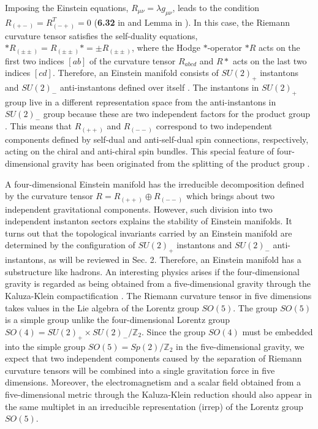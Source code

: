 \documentclass[12pt,epsf]{article}
\begin{document}
Imposing the Einstein equations, $R_{\mu\nu} = \lambda g_{\mu\nu}$, leads to the condition
$R_{(+-)} = R_{(-+)}^T = 0$ (\textbf{6.32} in \cite{book-besse} and Lemma in \cite{oh-yang}).
In this case, the Riemann curvature tensor satisfies the self-duality equations,
$* R_{(\pm \pm)} =  R_{(\pm \pm)} * = \pm  R_{(\pm \pm)}$, where
the Hodge $*$-operator $* R$ acts on the first two indices $[ab]$ of the curvature tensor $R_{abcd}$ and
$R*$ acts on the last two indices $[cd]$.
Therefore, an Einstein manifold consists of $SU(2)_+$ instantons and $SU(2)_-$ anti-instantons
defined over itself \cite{oh-yang,joy-jhep}.
The instantons in $SU(2)_+$ group live in a different representation space from the anti-instantons in $SU(2)_-$ group
because these are two independent factors for the product group .
This means that $R_{(++)}$ and $R_{(--)}$ correspond to two independent components defined by self-dual and
anti-self-dual spin connections, respectively, acting on the chiral and anti-chiral spin bundles.
This special feature of four-dimensional gravity has been originated from the splitting of
the product group .




A four-dimensional Einstein manifold has the irreducible decomposition defined by the curvature tensor
$R = R_{(++)} \oplus R_{(--)}$ which brings about two independent gravitational components.
However, such division into two independent instanton sectors explains the stability of Einstein manifolds.
It turns out \cite{pos-yang} that the topological invariants carried by an Einstein manifold
are determined by the configuration of $SU(2)_+$ instantons and $SU(2)_-$ anti-instantons,
as will be reviewed in Sec. 2.
Therefore, an Einstein manifold has a substructure like hadrons.
An interesting physics arises if the four-dimensional gravity is regarded as being obtained
from a five-dimensional gravity through the Kaluza-Klein compactification \cite{kk-book}.
The Riemann curvature tensor in five dimensions takes values in the Lie algebra of
the Lorentz group $SO(5)$. The group $SO(5)$ is a simple group
unlike the four-dimensional Lorentz group $SO(4)= SU(2)_+ \times SU(2)_-/\mathbb{Z}_2$.
Since the group $SO(4)$ must be embedded into the simple group $SO(5) = Sp(2)/\mathbb{Z}_2$
in the five-dimensional gravity, we expect that two independent components
caused by the separation of Riemann curvature tensors will be combined into a single gravitation force
in five dimensions. Moreover, the electromagnetism and a scalar field obtained
from a five-dimensional metric through the Kaluza-Klein reduction
should also appear in the same multiplet in an irreducible representation (irrep) of
the Lorentz group $SO(5)$.
\end{document}

